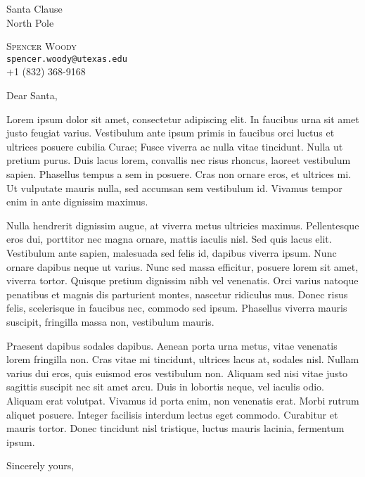 \documentclass[12pt]{letter}
\date{\today}
\begin{document}

\begin{letter}{Santa Clause \\
North Pole 
}


\begin{center}
\large \textsc{Spencer Woody} \\ 
\small \texttt{spencer.woody@utexas.edu} \\ +1 (832) 368-9168 
\end{center} 

\bigskip

\signature{Spencer Woody \\ PhD Student}


\opening{Dear Santa,} 

Lorem ipsum dolor sit amet, consectetur adipiscing elit. In faucibus
urna sit amet justo feugiat varius. Vestibulum ante ipsum primis in
faucibus orci luctus et ultrices posuere cubilia Curae; Fusce viverra
ac nulla vitae tincidunt. Nulla ut pretium purus. Duis lacus lorem,
convallis nec risus rhoncus, laoreet vestibulum sapien. Phasellus
tempus a sem in posuere. Cras non ornare eros, et ultrices mi. Ut
vulputate mauris nulla, sed accumsan sem vestibulum id. Vivamus tempor
enim in ante dignissim maximus.

Nulla hendrerit dignissim augue, at viverra metus ultricies
maximus. Pellentesque eros dui, porttitor nec magna ornare, mattis
iaculis nisl. Sed quis lacus elit. Vestibulum ante sapien, malesuada
sed felis id, dapibus viverra ipsum. Nunc ornare dapibus neque ut
varius. Nunc sed massa efficitur, posuere lorem sit amet, viverra
tortor. Quisque pretium dignissim nibh vel venenatis. Orci varius
natoque penatibus et magnis dis parturient montes, nascetur ridiculus
mus. Donec risus felis, scelerisque in faucibus nec, commodo sed
ipsum. Phasellus viverra mauris suscipit, fringilla massa non,
vestibulum mauris.

Praesent dapibus sodales dapibus. Aenean porta urna metus, vitae
venenatis lorem fringilla non. Cras vitae mi tincidunt, ultrices lacus
at, sodales nisl. Nullam varius dui eros, quis euismod eros vestibulum
non. Aliquam sed nisi vitae justo sagittis suscipit nec sit amet
arcu. Duis in lobortis neque, vel iaculis odio. Aliquam erat
volutpat. Vivamus id porta enim, non venenatis erat. Morbi rutrum
aliquet posuere. Integer facilisis interdum lectus eget
commodo. Curabitur et mauris tortor. Donec tincidunt nisl tristique,
luctus mauris lacinia, fermentum ipsum.

\closing{Sincerely yours,}


\end{letter}
\end{document}
